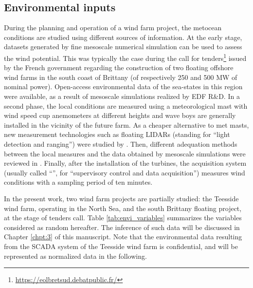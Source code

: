 \subsection{Environmental inputs}
During the planning and operation of a wind farm project, the metocean conditions are studied using different sources of information. 
At the early stage, datasets generated by fine mesoscale numerical simulation can be used to assess the wind potential. 
This was typically the case during the call for tenders\footnote{\url{https://eolbretsud.debatpublic.fr/}} issued by the French government regarding the construction of two floating offshore wind farms in the south coast of Brittany (of respectively 250 and 500 MW of nominal power). 
Open-access environmental data of the sea-states in this region were available, as a result of mesoscale simulations \citep{raoult_2018_anemoc3} realized by EDF R\&D.    
In a second phase, the local conditions are measured using a meteorological mast with wind speed cup anemometers at different heights and wave boys are generally installed in the vicinity of the future farm. 
As a cheaper alternative to met masts, new measurement technologies such as floating LIDARs (standing for ``light detection and ranging'') were studied by \citet{gottschall_2017_floating_LIDAR}. 
Then, different adequation methods between the local measures and the data obtained by mesoscale simulations were reviewed in \citet{sempreviva_2008_wind_assessment_review}.  
Finally, after the installation of the turbines, the acquisition system (usually called ``'', for ``supervisory control and data acquisition'') measures wind conditions with a sampling period of ten minutes. 

In the present work, two wind farm projects are partially studied\footnotemark: the Teesside wind farm, operating in the North Sea, and the south Brittany floating project, at the stage of tenders call. 
Table \ref{tab:envi_variables} summarizes the variables considered as random hereafter. 
The inference of such data will be discussed in Chapter \ref{chpt:3} of this manuscript. 
Note that the environmental data resulting from the SCADA system of the Teesside wind farm is confidential, and will be represented as normalized data in the following. 


